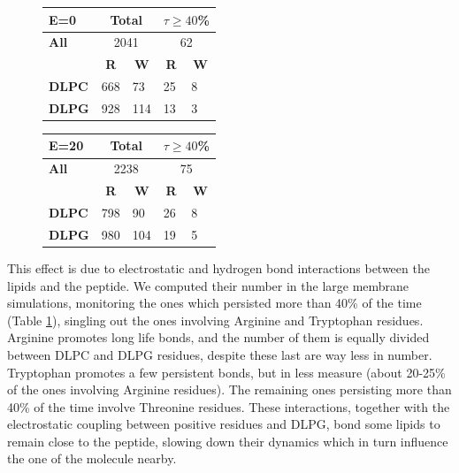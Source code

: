 \begin{figure}[h!]
\centering
 \def\arraystretch{1.6}
\begin{tabular}{l|ll|ll}
\hline
\textbf{E=0} & \multicolumn{2}{c|}{Total} & \multicolumn{2}{c}{$\displaystyle\tau \ge 40$\%} \\
\hline
\textbf{All} & \multicolumn{2}{c|}{2041} & \multicolumn{2}{c}{62} \\
\hline
\hline
  & \multicolumn{1}{c}{\textbf{R}} & \multicolumn{1}{c|}{\textbf{W}} & \multicolumn{1}{c}{\textbf{R}} & \multicolumn{1}{c}{\textbf{W}} \\
 \hline
 \textbf{DLPC} & 668 & 73 & 25 & 8 \\
 \textbf{DLPG} & 928 & 114 & 13 & 3 \\
 \hline
 \end{tabular}
 \hspace{0.4cm}
 \begin{tabular}{l|ll|ll}
 \hline
\textbf{E=20} & \multicolumn{2}{c|}{Total} & \multicolumn{2}{c}{$\displaystyle\tau \ge 40$\%} \\
\hline
\textbf{All} & \multicolumn{2}{c|}{2238} & \multicolumn{2}{c}{75} \\
\hline
\hline
 & \multicolumn{1}{c}{\textbf{R}} & \multicolumn{1}{c|}{\textbf{W}} & \multicolumn{1}{c}{\textbf{R}} & \multicolumn{1}{c}{\textbf{W}} \\
 \hline
 \textbf{DLPC} & 798 & 90 & 26 & 8 \\
 \textbf{DLPG} & 980 & 104 & 19 & 5 \\
 \hline
 \end{tabular}
\label{table:hb_pr_lip}
\vspace{1cm}
\end{figure}

This effect is due to electrostatic and hydrogen bond interactions between the lipids and the peptide. We computed their number in the large membrane simulations, monitoring the ones which persisted more than 40\% of the time (Table \ref{table:hb_pr_lip}), singling out the ones involving Arginine and Tryptophan residues.
%
Arginine promotes long life bonds, and the number of them is equally divided between DLPC and DLPG residues, despite these last are way less in number. Tryptophan promotes a few persistent bonds, but in less measure (about 20-25\% of the ones involving Arginine residues). The remaining ones persisting more than 40\% of the time involve Threonine residues.
%
These interactions, together with the electrostatic coupling between positive residues and DLPG, bond some lipids to remain close to the peptide, slowing down their dynamics which in turn influence the one of the molecule nearby.

